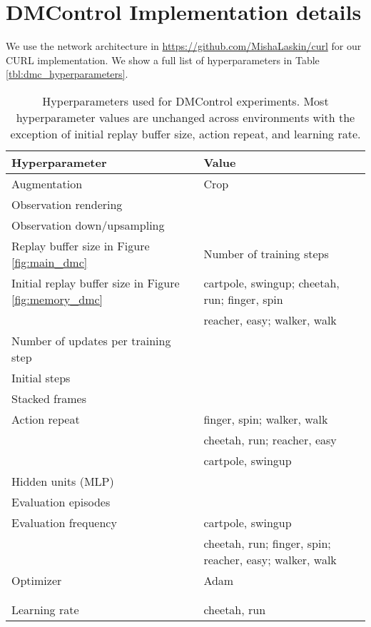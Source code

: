 \documentclass{article}
\begin{document}
\section{DMControl Implementation details} \label{appendix:dmc_implementation_details}
We use the network architecture in \url{https://github.com/MishaLaskin/curl} for our CURL \citep{srinivas2020curl} implementation. We show a full list of hyperparameters in Table \ref{tbl:dmc_hyperparameters}.

\begin{table*}[ht]
\caption{Hyperparameters used for DMControl experiments. Most hyperparameter values are unchanged across environments with the exception of initial replay buffer size, action repeat, and learning rate.}
\vskip 0.15in
\begin{center}
\begin{small}
\begin{tabular}{ll}
\toprule
\textbf{Hyperparameter} & \textbf{Value}  \\
\midrule
Augmentation    & Crop  \\ 
Observation rendering    &   \\ 
Observation down/upsampling    &  \\ 
Replay buffer size in Figure \ref{fig:main_dmc}   & Number of training steps \\ 
Initial replay buffer size in Figure \ref{fig:memory_dmc}  &  cartpole, swingup; cheetah, run; finger, spin \\
 &  reacher, easy; walker, walk \\
Number of updates per training step  &  \\
Initial steps    &   \\ 
Stacked frames    &   \\ 
Action repeat    &  finger, spin; walker, walk\\
 &  cheetah, run; reacher, easy  \\
 &  cartpole, swingup \\
Hidden units (MLP)    &   \\ 
Evaluation episodes    &   \\ 
Evaluation frequency    &  cartpole, swingup \\ 
 &  cheetah, run; finger, spin; reacher, easy; walker, walk \\
Optimizer    & Adam  \\ 
   &   \\
   &   \\
Learning rate  &  cheetah, run \\ 

\end{tabular}
\end{small}
\end{center}
\end{table*}
\end{document}
